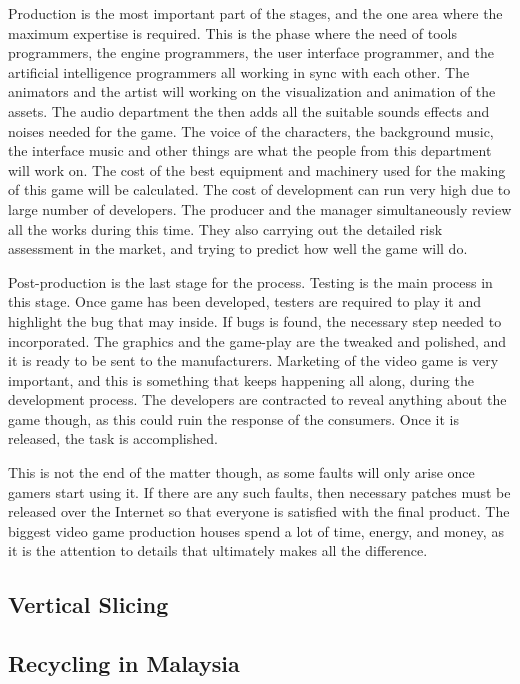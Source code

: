 \documentclass[12pt]{article}
\begin{document}
Production is the most important part of the stages, and the one area where the maximum expertise is required. This is the phase where the need of tools programmers, the engine programmers, the user interface programmer, and the artificial intelligence programmers all working in sync with each other. The animators and the artist will working on the visualization and animation of the assets. The audio department the then adds all the suitable sounds effects and noises needed for the game. The voice of the characters, the background music, the interface music and other things are what the people from this department will work on. The cost of the best equipment and machinery used for the making of this game will be calculated. The cost of development can run very high due to large number of developers. The producer and the manager simultaneously review all the works during this time. They also carrying out the detailed risk assessment in the market, and trying to predict how well the game will do.
\par
Post-production is the last stage for the process. Testing is the main process in this stage. Once game has been developed, testers are required to play it and highlight the bug that may inside. If bugs is found, the necessary step needed to incorporated. The graphics and the game-play are the tweaked and polished, and it is ready to be sent to the manufacturers. Marketing of the video game is very important, and this is something that keeps happening all along, during the development process. The developers are contracted to reveal anything about the game though, as this could ruin the response of the consumers. Once it is released, the task is accomplished.

This is not the end of the matter though, as some faults will only arise once gamers start using it. If there are any such faults, then necessary patches must be released over the Internet so that everyone is satisfied with the final product. The biggest video game production houses spend a lot of time, energy, and money, as it is the attention to details that ultimately makes all the difference.

\subsection{Vertical Slicing}



\subsection{Recycling in Malaysia}
\end{document}
